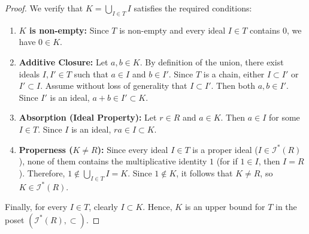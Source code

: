\begin{content}

\begin{proof}
We verify that $K = \bigcup_{I \in T} I$ satisfies the required conditions:
\begin{enumerate}[label=\textbf{(\arabic*)}]
    \setcounter{enumi}{0} \item \textbf{$K$ is non-empty:} Since $T$ is non-empty and every ideal $I \in T$ contains $0$, we have $0 \in K$.
    \item \textbf{Additive Closure:} Let $a, b \in K$. By definition of the union, there exist ideals $I, I' \in T$ such that $a \in I$ and $b \in I'$. Since $T$ is a chain, either $I \subset I'$ or $I' \subset I$. Assume without loss of generality that $I \subset I'$. Then both $a, b \in I'$. Since $I'$ is an ideal, $a + b \in I' \subset K$.
    \item \textbf{Absorption (Ideal Property):} Let $r \in R$ and $a \in K$. Then $a \in I$ for some $I \in T$. Since $I$ is an ideal, $ra \in I \subset K$.
    \item \textbf{Properness ($K \neq R$):} Since every ideal $I \in T$ is a proper ideal ($I \in \mathscr{I}^*(R)$), none of them contains the multiplicative identity $1$ (for if $1 \in I$, then $I = R$). Therefore, $1 \notin \bigcup_{I \in T} I = K$. Since $1 \notin K$, it follows that $K \neq R$, so $K \in \mathscr{I}^*(R)$.
\end{enumerate}
Finally, for every $I \in T$, clearly $I \subset K$. Hence, $K$ is an upper bound for $T$ in the poset $(\mathscr{I}^*(R), \subset)$.
\end{proof}



\end{content}
